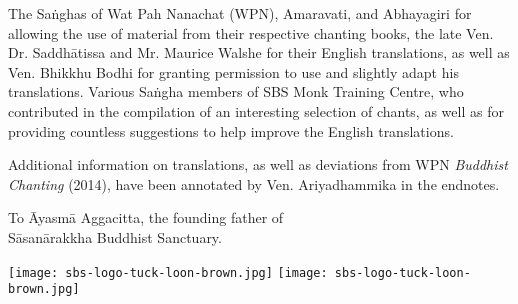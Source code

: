 
\cleartorecto
\thispagestyle{empty}

{\setlength{\parskip}{10pt}

  \fi

  \fi


  The Saṅghas of Wat Pah Nanachat (WPN), Amaravati, and Abhayagiri for allowing the use of material from their respective chanting books, the late Ven. Dr. Saddhātissa and Mr. Maurice Walshe for their English translations, as well as Ven. Bhikkhu Bodhi for granting permission to use and slightly adapt his translations. Various Saṅgha members of SBS Monk Training Centre, who contributed in the compilation of an interesting selection of chants, as well as for providing countless suggestions to help improve the English translations.

  Additional information on translations, as well as deviations\makeatletter\hyperlink{endnote1-appendix}\makeatother\thickspace
  from WPN \textit{Buddhist Chanting} (2014), have been annotated by Ven. Ariyadhammika in the endnotes.

  \medskip

  {\centering
    To Āyasmā Aggacitta, the founding father of\\
    Sāsanārakkha Buddhist Sanctuary.

    \medskip

    \ifafiveversion \texttt{[image: sbs-logo-tuck-loon-brown.jpg]} \fi
    \ifasixversion \texttt{[image: sbs-logo-tuck-loon-brown.jpg]} \fi

  }

}

